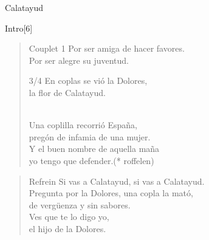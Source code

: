 \begin{song}{Calatayud}
\begin{instrumental}{Intro}[6]
\measure{}\measure{}\measure{}\measure{}\measure{}
\measure{}\measure{}\measure{}\measure{}\measure{}
\measure{}\measure{}\measure{}\measure{}\measure{}
\measure{}\measure{}\measure{}\measure{}
\end{instrumental}

\begin{verse}{Couplet 1}
Por ser amiga de hacer favores.\\
Por ser alegre su juventud.\hspace{0.5em}\hspace{0.5em}\\
\begin{sidenote}{3/4}
En coplas se vió la Dolores,\\
la flor de Calatayud.
\end{sidenote}\\
Una coplilla recorrió España,\\
pregón de infamia de una mujer.\\
Y el buen nombre\hspace{0.5em}\hspace{0.5em} de aquella maña\\
yo tengo que defender.\hspace{3em}(* roffelen)\\
\end{verse}

\begin{verse}{Refrein}
Si vas a Calatayud, si vas a Calatayud.\\
Pregunta por la Dolores, una copla la mató,\\
de vergüenza y sin sabores.\\
\chord{}Ves que te lo digo yo,\\
el hijo de la Dolores. \hspace{1.5em}\hspace{1.5em}\hspace{1.5em}\\
\end{verse}


\end{song}
